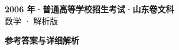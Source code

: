 \documentclass[zihao=-4, a4paper]{ctexart}
\begin{document}
\begin{center}
  {\Large\bfseries 2006 年·普通高等学校招生考试·山东卷文科}\\[4pt]
  {\large 数学 · 解析版}
\end{center}
\medskip
{}

\clearpage
{}
\begin{center}{\Large\bfseries 参考答案与详细解析}\end{center}
\medskip

\end{document}

